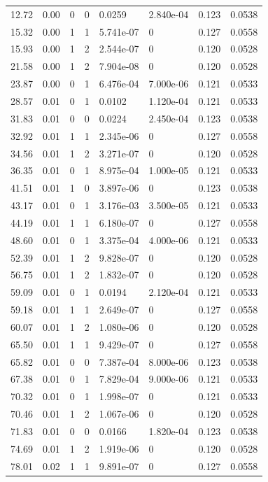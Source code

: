 \documentclass[preview]{standalone}
\begin{document}
{{\begin{tabular}{L{1.2cm}C{1.2cm} C{0.3cm}C{0.5cm} C{1.4cm}C{1.4cm} C{1.4cm}C{1.4cm}}
  12.72  &  0.00  & 0     &  0 &  0.0259  & 2.840e-04  & 0.123 &  0.0538   \\ 
  15.32  &  0.00  & 1     &  1 &  5.741e-07  & 0  & 0.127 &  0.0558   \\ 
  15.93  &  0.00  & 1     &  2 &  2.544e-07  & 0  & 0.120 &  0.0528   \\ 
  21.58  &  0.00  & 1     &  2 &  7.904e-08  & 0  & 0.120 &  0.0528   \\ 
  23.87  &  0.00  & 0     &  1 &  6.476e-04  & 7.000e-06  & 0.121 &  0.0533   \\ 
  28.57  &  0.01  & 0     &  1 &  0.0102  & 1.120e-04  & 0.121 &  0.0533   \\ 
  31.83  &  0.01  & 0     &  0 &  0.0224  & 2.450e-04  & 0.123 &  0.0538   \\ 
  32.92  &  0.01  & 1     &  1 &  2.345e-06  & 0  & 0.127 &  0.0558   \\ 
  34.56  &  0.01  & 1     &  2 &  3.271e-07  & 0  & 0.120 &  0.0528   \\ 
  36.35  &  0.01  & 0     &  1 &  8.975e-04  & 1.000e-05  & 0.121 &  0.0533   \\ 
  41.51  &  0.01  & 1     &  0 &  3.897e-06  & 0  & 0.123 &  0.0538   \\ 
  43.17  &  0.01  & 0     &  1 &  3.176e-03  & 3.500e-05  & 0.121 &  0.0533   \\ 
  44.19  &  0.01  & 1     &  1 &  6.180e-07  & 0  & 0.127 &  0.0558   \\ 
  48.60  &  0.01  & 0     &  1 &  3.375e-04  & 4.000e-06  & 0.121 &  0.0533   \\ 
  52.39  &  0.01  & 1     &  2 &  9.828e-07  & 0  & 0.120 &  0.0528   \\ 
  56.75  &  0.01  & 1     &  2 &  1.832e-07  & 0  & 0.120 &  0.0528   \\ 
  59.09  &  0.01  & 0     &  1 &  0.0194  & 2.120e-04  & 0.121 &  0.0533   \\ 
  59.18  &  0.01  & 1     &  1 &  2.649e-07  & 0  & 0.127 &  0.0558   \\ 
  60.07  &  0.01  & 1     &  2 &  1.080e-06  & 0  & 0.120 &  0.0528   \\ 
  65.50  &  0.01  & 1     &  1 &  9.429e-07  & 0  & 0.127 &  0.0558   \\ 
  65.82  &  0.01  & 0     &  0 &  7.387e-04  & 8.000e-06  & 0.123 &  0.0538   \\ 
  67.38  &  0.01  & 0     &  1 &  7.829e-04  & 9.000e-06  & 0.121 &  0.0533   \\ 
  70.32  &  0.01  & 0     &  1 &  1.998e-07  & 0  & 0.121 &  0.0533   \\ 
  70.46  &  0.01  & 1     &  2 &  1.067e-06  & 0  & 0.120 &  0.0528   \\ 
  71.83  &  0.01  & 0     &  0 &  0.0166  & 1.820e-04  & 0.123 &  0.0538   \\ 
  74.69  &  0.01  & 1     &  2 &  1.919e-06  & 0  & 0.120 &  0.0528   \\ 
  78.01  &  0.02  & 1     &  1 &  9.891e-07  & 0  & 0.127 &  0.0558   \\ 
\hline 
\end{tabular} 

}}
\end{document}
